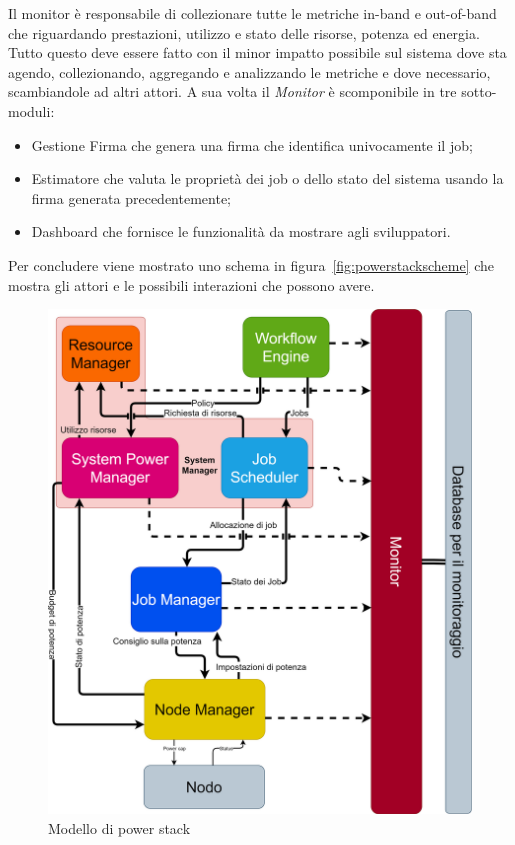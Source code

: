 Il monitor è responsabile di collezionare tutte le metriche in-band e out-of-band che riguardando prestazioni, utilizzo e stato delle risorse, potenza ed energia.
Tutto questo deve essere fatto con il minor impatto possibile sul sistema dove sta agendo, collezionando, aggregando e analizzando le metriche e dove necessario, scambiandole ad altri attori. A sua volta il \emph{Monitor} è scomponibile in tre sotto-moduli:
\begin{itemize}
    \item Gestione Firma che genera una firma che identifica univocamente il job; 
    \item Estimatore che valuta le proprietà dei job o dello stato del sistema usando la firma generata precedentemente;
    \item Dashboard che fornisce le funzionalità da mostrare agli sviluppatori.
\end{itemize}


Per concludere viene mostrato uno schema in figura~\ref{fig:powerstackscheme} che mostra gli attori e le possibili interazioni che possono avere.
\begin{figure}[H]
    \centering
    \includegraphics[width=\textwidth]{img/SchemaPowerStack.drawio.png}
    \caption{Modello di power stack}\label{fig:minpowerstackscheme}
\end{figure}


